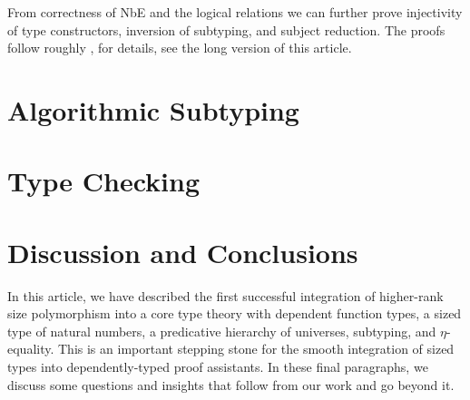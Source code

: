 \documentclass[acmsmall%
]{acmart}\settopmatter{printfolios=true}
\newcommand{\LONGVERSION}[1]{}
\newcommand{\SHORTVERSION}[1]{#1}
\begin{document}
\LONGVERSION{

} %
\SHORTVERSION{
From correctness of NbE and the logical relations we can further prove
injectivity of type constructors, inversion of subtyping, and subject reduction.
The proofs follow roughly \citet{fridlenderPagano:tlca13}, for
details, see the long version of this article.
} %

\section{Algorithmic Subtyping}
\label{sec:asub}


% 


\section{Type Checking}
\label{sec:tycheck}


% 

\section{Discussion and Conclusions}
\label{sec:concl}

In this article, we have described the first successful integration of higher-rank size polymorphism into a core type theory with dependent function types, a sized type of natural numbers, a predicative hierarchy of universes, subtyping, and $\eta$-equality.  This is an important stepping stone for the smooth integration of sized types into dependently-typed proof assistants.
In these final paragraphs, we discuss some questions and insights that follow from our work and go beyond it.
\end{document}
